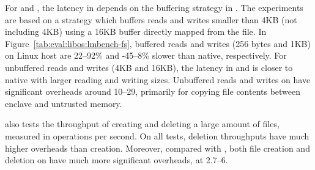 For  and ,
the latency in \graphene{} depends on the buffering strategy in \thelibos{}.
The experiments
are based on a strategy which
buffers reads and writes smaller than 4KB (not including 4KB)
using a 16KB buffer directly mapped from the file.
In Figure~\ref{tab:eval:libos:lmbench-fs}, buffered reads and writes (256 bytes and 1KB) on Linux host
are 22--92\% and -45--8\% slower than native, respectively.
For unbuffered reads and writes (4KB and 16KB),
the latency in \graphene{} and \graphenesgx{}
is closer to native with larger reading and writing sizes.
Unbuffered reads and writes
on \graphenesgx{}
have significant overheads around 10--29\x{}, primarily for copying file contents
between enclave and untrusted memory.

\lmbench{} also tests the throughput of creating and deleting a large amount of files,
measured in operations per second.
On all tests, deletion throughputs have much higher overheads than creation. Moreover, compared with \graphene{}, 
both file creation and deletion on \graphenesgx{} have much more significant overheads,
at 2.7--6\x{}.

